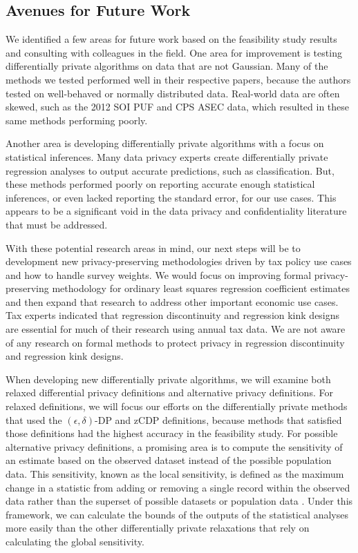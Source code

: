 \subsection{Avenues for Future Work}\label{subsec:future}
We identified a few areas for future work based on the feasibility study results and consulting with colleagues in the field. One area for improvement is testing differentially private algorithms on data that are not Gaussian. Many of the methods we tested performed well in their respective papers, because the authors tested on well-behaved or normally distributed data. Real-world data are often skewed, such as the 2012 SOI PUF and CPS ASEC data, which resulted in these same methods performing poorly.

Another area is developing differentially private algorithms with a focus on statistical inferences. Many data privacy experts create differentially private regression analyses to output accurate predictions, such as classification. But, these methods performed poorly on reporting accurate enough statistical inferences, or even lacked reporting the standard error, for our use cases. This appears to be a significant void in the data privacy and confidentiality literature that must be addressed.

With these potential research areas in mind, our next steps will be to development new privacy-preserving methodologies driven by tax policy use cases and how to handle survey weights. We would focus on improving formal privacy-preserving methodology for ordinary least squares regression coefficient estimates and then expand that research to address other important economic use cases. Tax experts indicated that regression discontinuity and regression kink designs are essential for much of their research using annual tax data. We are not aware of any research on formal methods to protect privacy in regression discontinuity and regression kink designs.

When developing new differentially private algorithms, we will examine both relaxed differential privacy definitions and alternative privacy definitions. For relaxed definitions, we will focus our efforts on the differentially private methods that used the $(\epsilon,\delta)$-DP and zCDP definitions, because methods that satisfied those definitions had the highest accuracy in the feasibility study. For possible alternative privacy definitions, a promising area is to compute the sensitivity of an estimate based on the observed dataset instead of the possible population data. This sensitivity, known as the local sensitivity, is defined as the maximum change in a statistic from adding or removing a single record within the observed data rather than the superset of possible datasets or population data \autocite{nissim2007smooth}. Under this framework, we can calculate the bounds of the outputs of the statistical analyses more easily than the other differentially private relaxations that rely on calculating the global sensitivity.

